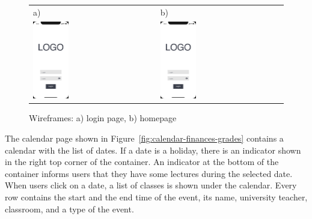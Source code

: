 \begin{figure}[htb]
    \centering
    \begin{tabular}{@{}ll@{}}
        a) & b) \\
        \includegraphics[page=1,width=0.300\textwidth]{fig04/jsos_helper_wireframe.pdf} &
        \includegraphics[page=7,width=0.300\textwidth]{fig04/jsos_helper_wireframe.pdf} \\
    \end{tabular}
    \caption{Wireframes: a) login page, b) homepage} \label{fig:login-home}
\end{figure}

The calendar page shown in Figure~\ref{fig:calendar-finances-grades} contains a calendar with the list of dates. If a date is a holiday, there is an indicator shown in the right top corner of the container. An indicator at the bottom of the container informs users that they have some lectures during the selected date.
When users click on a date, a list of classes is shown under the calendar. Every row contains the start and the end time of the event, its name, university teacher, classroom, and a type of the event.

